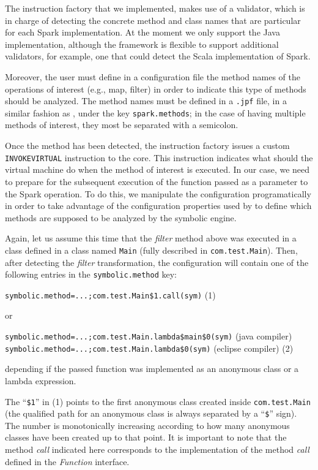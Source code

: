 The instruction factory that we implemented, makes use of a validator, which is in charge of detecting the concrete method and class names that are particular for each Spark implementation. At the moment we only support the Java implementation, although the framework is flexible to support additional validators, for example, one that could detect the Scala implementation of Spark.

Moreover, the user must define in a configuration file the method names of the operations of interest (e.g., map, filter) in order to indicate this type of methods should be analyzed. The method names must be defined in a \texttt{.jpf} file, in a similar fashion as \spf, under the key \texttt{spark.methods}; in the case of having multiple methods of interest, they most be separated with a semicolon.

Once the method has been detected, the instruction factory issues a custom \texttt{INVOKEVIRTUAL} instruction to the \jpf core. This instruction indicates what should the \jpf virtual machine do when the method of interest is executed. In our case, we need to prepare for the subsequent execution of the function passed as a parameter to the Spark operation. To do this, we manipulate the \jpf configuration programatically in order to take advantage of the configuration properties used by \spf to define which methods are supposed to be analyzed by the symbolic engine.

Again, let us assume this time that the \textit{filter} method above was executed in a class defined in a class named \texttt{Main} (fully described in \texttt{com.test.Main}). Then, after detecting the \textit{filter} transformation, the configuration will contain one of the following entries in the \texttt{symbolic.method} key:

\hspace*{1cm} \lstinline[]|symbolic.method=...;com.test.Main$1.call(sym)|  \hfill (1)

or

\hspace*{1cm} \lstinline[]|symbolic.method=...;com.test.Main.lambda$main$0(sym)| (java compiler) \\
\hspace*{1cm} \lstinline[]|symbolic.method=...;com.test.Main.lambda$0(sym)| (eclipse compiler) \hfill (2)

depending if the passed function was implemented as an anonymous class or a lambda expression. 

The ``\texttt{\$1}'' in (1) points to the first anonymous class created inside \texttt{com.test.Main} (the qualified path for an anonymous class is always separated by a ``\texttt{\$}'' sign). The number is monotonically increasing according to how many anonymous classes have been created up to that point. It is important to note that the method \textit{call} indicated here corresponds to the implementation of the method \textit{call} defined in the \textit{Function} interface.

